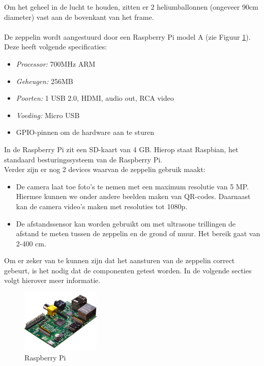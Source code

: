 \documentclass[eind]{penoverslag}
\begin{document}
Om het geheel in de lucht te houden, zitten er 2 heliumballonnen (ongeveer 90cm diameter) vast aan de bovenkant van het frame. \\
\\
De zeppelin wordt aangestuurd door een Raspberry Pi model A (zie Figuur \ref{Pi}). Deze heeft volgende specificaties: 
\begin{itemize}
	\item \emph{Processor:} 700MHz ARM
	\item \emph{Geheugen:} 256MB 
	\item \emph{Poorten:} 1 USB 2.0, HDMI, audio out, RCA video
	\item \emph{Voeding:} Micro USB
	\item GPIO-pinnen om de hardware aan te sturen
\end{itemize}

In de Raspberry Pi zit een SD-kaart van 4 GB. Hierop staat Raspbian, het standaard besturingssysteem van de Raspberry Pi. \\

Verder zijn er nog 2 devices waarvan de zeppelin gebruik maakt:
\begin{itemize}
	\item De camera laat toe foto's te nemen met een maximum resolutie van 5 MP. Hiermee kunnen we onder andere beelden maken van QR-codes. Daarnaast kan de camera video's maken met resoluties tot 1080p. 
	\item De afstandssensor kan worden gebruikt om met ultrasone trillingen de afstand te meten tussen de zeppelin en de grond of muur. Het bereik gaat van 2-400 cm. \\
\end{itemize}

Om er zeker van te kunnen zijn dat het aansturen van de zeppelin correct gebeurt, is het nodig dat de componenten getest worden. In de volgende secties volgt hierover meer informatie.\\

\begin{figure}[ht!]
\centering
\includegraphics[height=30mm]{raspb.jpg}
\caption{Raspberry Pi}
\label{Pi}
\end{figure}
\end{document}
